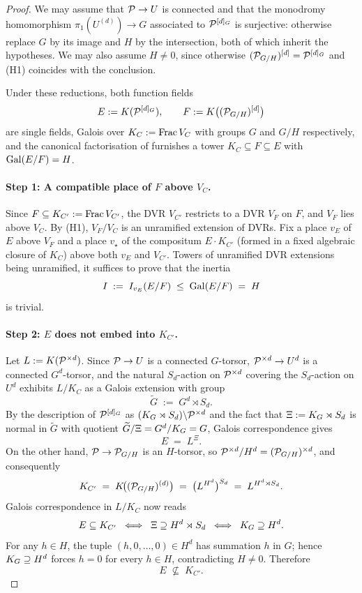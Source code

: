\documentclass[11pt]{article}
\begin{document}
\begin{proof}
We may assume that $\mathcal{P} \to U$ is connected and that the monodromy
homomorphism $\pi_1(U^{(d)}) \to G$ associated to $\mathcal{P}^{[d]_G}$ is surjective:
otherwise replace $G$ by its image and $H$ by the intersection, both of which
inherit the hypotheses. We may also assume $H \neq 0$, since otherwise
$(\mathcal{P}_{G/H})^{[d]} = \mathcal{P}^{[d]_G}$ and (H1) coincides with the conclusion.

Under these reductions, both function fields
\[
E := K(\mathcal{P}^{[d]_G}), \qquad F := K\bigl((\mathcal{P}_{G/H})^{[d]}\bigr)
\]
are single fields, Galois over $K_C := \operatorname{Frac} V_C$ with groups $G$ and $G/H$
respectively, and the canonical factorisation of
 furnishes a tower
$K_C \subseteq F \subseteq E$ with $\operatorname{Gal}(E/F) = H$.

\paragraph{Step 1: A compatible place of $F$ above $V_C$.}
Since $F \subseteq K_{C'} := \operatorname{Frac} V_{C'}$, the DVR $V_{C'}$ restricts to a DVR
$V_F$ on $F$, and $V_F$ lies above $V_C$. By (H1), $V_F/V_C$ is an unramified
extension of DVRs. Fix a place $v_E$ of $E$ above $V_F$ and a place $v_\star$
of the compositum $E \cdot K_{C'}$ (formed in a fixed algebraic closure of
$K_C$) above both $v_E$ and $V_{C'}$. Towers of unramified DVR extensions
being unramified, it suffices to prove that the inertia
\[
I \;:=\; I_{v_E}(E/F) \;\leq\; \operatorname{Gal}(E/F) \;=\; H
\]
is trivial.

\paragraph{Step 2: $E$ does not embed into $K_{C'}$.}
Let $L := K(\mathcal{P}^{\times d})$. Since $\mathcal{P} \to U$ is a connected $G$-torsor,
$\mathcal{P}^{\times d} \to U^d$ is a connected $G^d$-torsor, and the natural
$S_d$-action on $\mathcal{P}^{\times d}$ covering the $S_d$-action on $U^d$ exhibits
$L/K_C$ as a Galois extension with group
\[
\widetilde G \;:=\; G^d \rtimes S_d .
\]
By the description of $\mathcal{P}^{[d]_G}$ as $(K_{G} \rtimes S_d)\backslash \mathcal{P}^{\times d}$
and the fact that $\Xi := K_{G} \rtimes S_d$ is normal in $\widetilde G$ with
quotient $\widetilde G/\Xi = G^d/K_{G} = G$, Galois correspondence gives
\[
E \;=\; L^{\Xi} .
\]
On the other hand, $\mathcal{P} \to \mathcal{P}_{G/H}$ is an $H$-torsor, so
$\mathcal{P}^{\times d}/H^d = (\mathcal{P}_{G/H})^{\times d}$, and consequently
\[
K_{C'} \;=\; K\!\bigl((\mathcal{P}_{G/H})^{(d)}\bigr)
       \;=\; \bigl(L^{H^d}\bigr)^{S_d}
       \;=\; L^{H^d \rtimes S_d} .
\]
Galois correspondence in $L/K_C$ now reads
\[
E \subseteq K_{C'}
   \;\iff\; \Xi \supseteq H^d \rtimes S_d
   \;\iff\; K_{G} \supseteq H^d .
\]
For any $h \in H$, the tuple $(h,0,\dots,0) \in H^d$ has summation $h$ in $G$;
hence $K_{G} \supseteq H^d$ forces $h = 0$ for every $h \in H$, contradicting
$H \neq 0$. Therefore
\[
E \;\not\subseteq\; K_{C'} .
\]


\end{proof}
\end{document}
